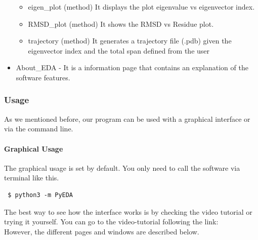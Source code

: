 \documentclass[12pt]{article}
\begin{document}
\begin{itemize}
	\begin{itemize}
		\item eigen\_plot (method) It displays the plot eigenvalue vs eigenvector index.
        \item RMSD\_plot (method) It shows the RMSD vs Residue plot. 
        \item trajectory (method) It generates a trajectory file (.pdb) given the eigenvector index and the total span defined from the user
	\end{itemize}
	\item About\_EDA - It is a information page that contains an explanation of the software features. 
\end{itemize}

\subsubsection{Usage}

As we mentioned before, our program can be used with a graphical interface or via the command line.

 \paragraph{Graphical Usage}
 The graphical usage is set by default. You only need to call the software via terminal like this. 
\begin{lstlisting}
 $ python3 -m PyEDA
 \end{lstlisting}
 
 The best way to see how the interface works is by checking the video tutorial or trying it yourself. You can go to the video-tutorial following the link:  \\
 
 However, the different pages and windows are described below. 
 
\end{document}
